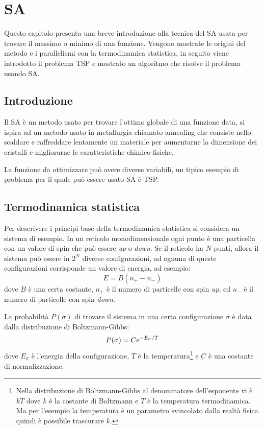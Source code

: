 \chapter{\acf{SA}}
  Questo capitolo presenta una breve introduzione alla tecnica del
  \acf{SA} usata per trovare il massimo o minimo di una
  funzione. Vengono mostrate le origini del metodo e i parallelismi
  con la termodinamica statistica, in seguito viene introdotto il
  problema \acf{TSP} e mostrato un algoritmo che risolve il problema
  usando \ac{SA}.
\section{Introduzione}
Il \ac{SA} \`e un metodo usato per trovare l'ottimo globale di una
funzione data, si ispira ad un metodo usato in metallurgia chiamato
annealing che consiste nello scaldare e raffreddare lentamente un
materiale per aumentarne la dimensione dei cristalli e migliorarne le
caratteristiche chimico-fisiche.

La funzione da ottimizzare pu\`o avere diverse variabili, un tipico
esempio di problema per il quale pu\`o essere usato \ac{SA} \`e
\ac{TSP}.

\section{Termodinamica statistica}
Per descrivere i principi base della termodinamica statistica si
considera un sistema di esempio. In un reticolo monodimensionale ogni
punto \`e una particella con un valore di spin che pu\`o essere
\emph{up} o
\emph{down}. Se il reticolo ha $N$ punti, allora il sistema pu\`o
essere in $2^N$ diverse configurazioni, ad ognuna di queste
configurazioni corrisponde un valore di energia, ad esempio:
\begin{equation*}
  E=B(n_+-n_-)
\end{equation*}
dove $B$ \`e una certa costante, $n_+$ \`e il numero di particelle con
spin 
\emph{up}, ed $n_-$ \`e il numero di particelle con spin \emph{down}.

La probabilit\`a $P(\sigma)$ di trovare il sistema in una certa
configurazione
$\sigma$ \`e data dalla distribuzione di Boltzmann-Gibbs:
\begin{equation}\label{eq:distBoltz}
  P(\sigma) = C \mathrm{e}^{-E_\sigma/T}
\end{equation}
dove $E_\sigma$ \`e l'energia della configurazione, $T$ \`e la
temperatura\footnote{Nella distribuzione di Boltzmann-Gibbs al
  denominatore dell'esponente vi \`e $kT$ dove $k$ \`e la costante di
  Boltzmann e $T$ \`e la temperatura termodinamica. Ma per l'esempio
  la temperatura \`e un parametro svincolato dalla realt\`a fisica
  quindi \`e possibile trascurare $k$.} e $C$ \`e una costante di
normalizzazione.

